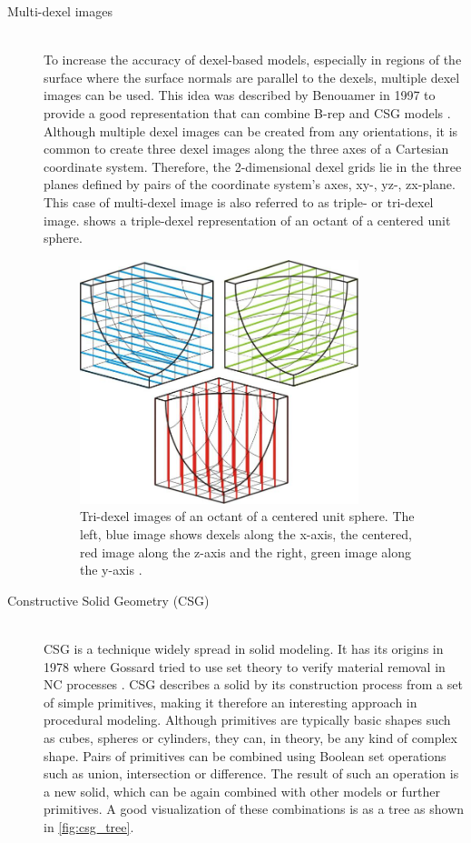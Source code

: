 \begin{description}
	\item[Multi-dexel images] \hfill \\
	To increase the accuracy of dexel-based models, especially in regions of the surface where the surface normals are parallel to the dexels, multiple dexel images can be used.
	This idea was described by Benouamer \etal in 1997 to provide a good representation that can combine B-rep and CSG models \cite{tridexel_intersection}.
	Although multiple dexel images can be created from any orientations, it is common to create three dexel images along the three axes of a Cartesian coordinate system.
	Therefore, the 2-dimensional dexel grids lie in the three planes defined by pairs of the coordinate system's axes, \ie xy-, yz-, zx-plane.
	This case of multi-dexel image is also referred to as triple- or tri-dexel image.
	 shows a triple-dexel representation of an octant of a centered unit sphere.

	\begin{figure}[H]
		\centering
		\includegraphics[width=0.8\textwidth]{images/tridexels}
		\caption[Tri-dexel image]{
			Tri-dexel images of an octant of a centered unit sphere.
			The left, blue image shows dexels along the x-axis, the centered, red image along the z-axis and the right, green image along the y-axis \cite{virtual_machining_review}.
		}
		\label{fig:tri_dexel_image}
	\end{figure}


	\item[Constructive Solid Geometry (CSG)] \hfill \\
	CSG is a technique widely spread in solid modeling.
	It has its origins in 1978 where Gossard \etal tried to use set theory to verify material removal in NC processes \cite{csg}.
	CSG describes a solid by its construction process from a set of simple primitives, making it therefore an interesting approach in procedural modeling.
	Although primitives are typically basic shapes such as cubes, spheres or cylinders, they can, in theory, be any kind of complex shape.
	Pairs of primitives can be combined using Boolean set operations such as union, intersection or difference.
	The result of such an operation is a new solid, which can be again combined with other models or further primitives.
	A good visualization of these combinations is as a tree as shown in \cref{fig:csg_tree}.


\end{description}
